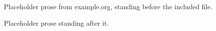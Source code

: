 \documentclass{article}
\begin{document}
Placeholder prose from example.org, standing before the included file.


Placeholder prose standing after it.
\end{document}
